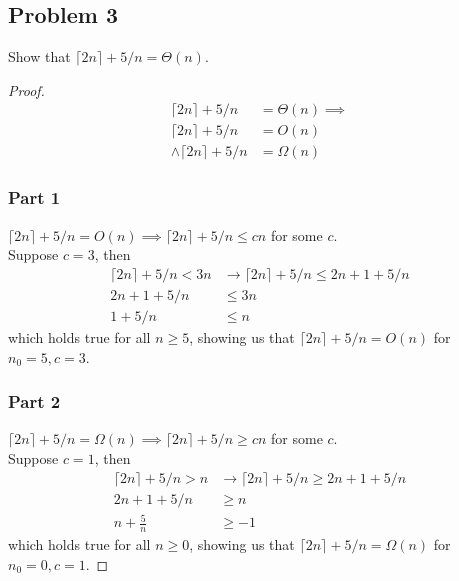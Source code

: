 \documentclass{article}
\begin{document}
\subsection*{Problem 3}
Show that \(\lceil 2n \rceil + 5/n = \Theta(n)\).
\begin{proof}
    \begin{align*}
        \lceil 2n \rceil + 5/n       & = \Theta(n) \implies \\
        \lceil 2n \rceil + 5/n       & = O(n)               \\
        \land \lceil 2n \rceil + 5/n & = \Omega(n)
    \end{align*}
    \subsubsection*{Part 1}
    \(\lceil 2n \rceil + 5/n = O(n) \implies \lceil 2n \rceil + 5/n \leq cn\) for some \(c\). \\
    Suppose \(c = 3\), then
    \begin{align*}
        \lceil 2n \rceil + 5/n < 3n & \rightarrow \lceil 2n \rceil + 5/n \leq 2n + 1 + 5/n \\
        2n + 1 + 5/n                & \leq 3n                                              \\
        1 + 5/n                     & \leq n
    \end{align*}
    which holds true for all \(n \geq 5\), showing us that \(\lceil 2n \rceil + 5/n = O(n)\) for \(n_0 = 5, c=3\).
    \subsubsection*{Part 2}
    \(\lceil 2n \rceil + 5/n = \Omega(n) \implies \lceil 2n \rceil + 5/n \geq cn\) for some \(c\). \\
    Suppose \(c = 1\), then
    \begin{align*}
        \lceil 2n \rceil + 5/n > n & \rightarrow \lceil 2n \rceil + 5/n \geq 2n + 1 + 5/n \\
        2n + 1 + 5/n               & \geq n                                               \\
        n + \frac{5}{n}            & \geq -1
    \end{align*}
    which holds true for all \(n \geq 0\), showing us that \(\lceil 2n \rceil + 5/n = \Omega(n)\) for \(n_0 = 0, c=1\).
\end{proof}
\end{document}
